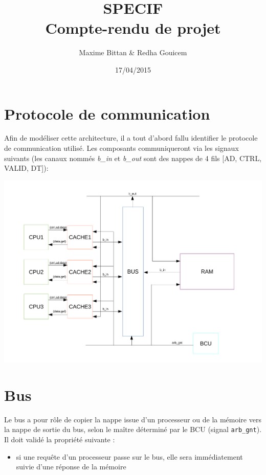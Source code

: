 \documentclass[a4paper, 11pt]{article}
\begin{document}
 
\title{SPECIF\\Compte-rendu de projet}
\author{Maxime Bittan \& Redha Gouicem}
\date{17/04/2015}
 
\maketitle

\section{Protocole de communication}
Afin de modéliser cette architecture, il a tout d'abord fallu identifier le 
protocole de communication utilisé. Les composants communiqueront via les
signaux suivants (les canaux nommés \textit{b\_in} et \textit{b\_out} sont
des nappes de 4 fils [AD, CTRL, VALID, DT]):
\begin{center}
\includegraphics[scale=0.5]{images/archi.pdf}
\end{center}

\section{Bus}
Le bus a pour rôle de copier la nappe issue d'un processeur ou de la mémoire
vers la nappe de sortie du bus, selon le maître déterminé par le BCU (signal
\texttt{arb\_gnt}). Il doit validé la propriété suivante :
\begin{itemize}
  \item si une requête d'un processeur passe sur le bus, elle sera immédiatement
    suivie d'une réponse de la mémoire
\end{itemize}
\end{document}
